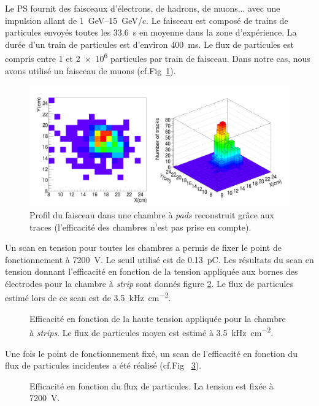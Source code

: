 Le PS fournit des faisceaux d'électrons, de hadrons, de muons... avec une impulsion allant de \SIrange{1}{15}{\giga\eV}/c. Le faisceau est composé de trains de particules envoyés toutes les \SI{33.6}{\second} en moyenne dans la zone d'expérience. La durée d'un train de particules est d'environ \SI{400}{\milli\second}. Le flux de particules est compris entre \num{1} et \num{2e6} particules par train de faisceau. Dans notre cas, nous avons utilisé un faisceau de muons (cf.Fig~\ref{faisceauPS}).
 
\begin{figure}[ht!]
	\centering
	\includegraphics[width=0.83\linewidth]{GLA/FaisceauPS.png}
	\caption{Profil du faisceau dans une chambre à \textit{pads} reconstruit grâce aux traces (l'efficacité des chambres n'est pas prise en compte).}
	\label{faisceauPS}
\end{figure}

Un scan en tension pour toutes les chambres a permis de fixer le point de fonctionnement à \SI{7200}{\volt}. Le seuil utilisé est de \SI{0.13}{\pico\coulomb}. Les résultats du scan en tension donnant l'efficacité en fonction de la tension appliquée aux bornes des électrodes pour la chambre à \textit{strip} sont donnés figure \ref{ScanTensionPS}. Le flux de particules estimé lors de ce scan est de \SI{3.5}{\kilo\hertz\per\square\centi\meter}.

\begin{figure}[!ht]
	\centering
	\caption{Efficacité en fonction de la haute tension appliquée pour la chambre à \textit{strips}. Le flux de particules moyen est estimé à \SI{3.5}{\kilo\hertz\per\square\centi\meter}.}
	\label{ScanTensionPS}
\end{figure}

Une fois le point de fonctionnement fixé, un scan de l'efficacité en fonction du flux de particules incidentes a été réalisé (cf.Fig~ \ref{ScanRatePS}).

\begin{figure}[!ht]
	\centering
	\caption{Efficacité en fonction du flux de particules. La tension est fixée à \SI{7200}{\volt}.}
	\label{ScanRatePS}
\end{figure}


